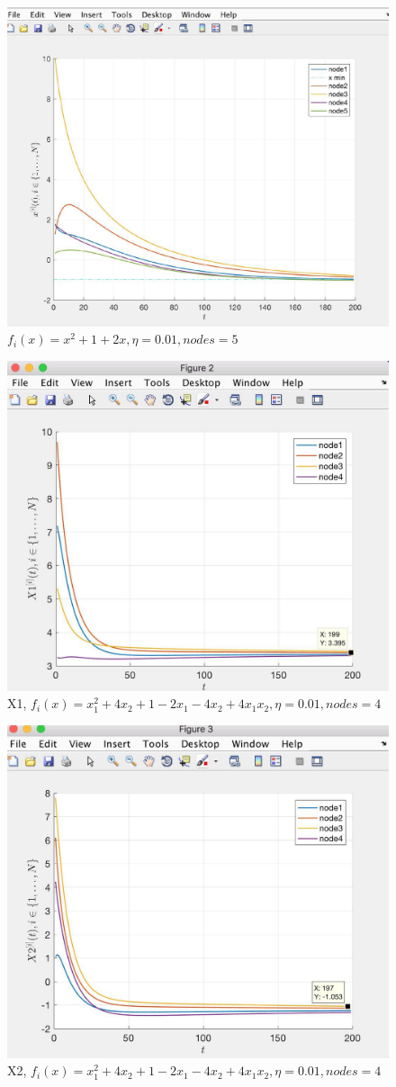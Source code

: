 \documentclass[a4paper,11pt,oneside]{book}
\begin{document}
{ 
 \begin{figure}[H]
	\centering
	\includegraphics[width=8 cm]{caso1.jpg}
	\caption{$f_i(x)= x^2 + 1 +2x,\eta = 0.01, nodes = 5$ }
	
\end{figure}


\begin{figure}
	\centering
	\includegraphics[width=8 cm]{caso2.jpg}
	\caption{X1, $f_i(x)= x_1^2 + 4x_2 + 1 - 2x_1 - 4x_2 +4x_1x_2 ,\eta = 0.01,nodes = 4$}
	
\end{figure}


\begin{figure}
	\centering
	\includegraphics[width=8 cm]{caso21.jpg}
	\caption{X2, $f_i(x)= x_1^2 + 4x_2 + 1 - 2x_1 - 4x_2 +4x_1x_2 ,\eta = 0.01,nodes = 4$}
	

\end{figure}}
\end{document}
